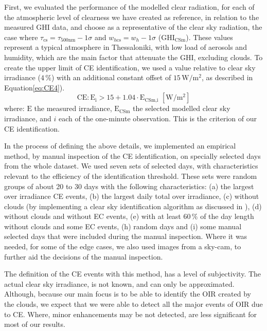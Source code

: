 \documentclass[preprint, 3p,
authoryear]{elsarticle} %
\begin{document}
First, we evaluated the performance of the modelled clear radiation, for
each of the atmospheric level of clearness we have created as reference,
in relation to the measured GHI data, and choose as a representative of
the clear sky radiation, the case where
\(\tau_{\text{cs}} = \tau_{500\text{nm}} - 1\sigma\) and
\(w_{h\text{cs}} = w_h - 1\sigma\) (\(\text{GHI}_\text{CSm}\)). These
values represent a typical atmosphere in Thessaloniki, with low load of
aerosols and humidity, which are the main factor that attenuate the GHI,
excluding clouds. To create the upper limit of CE identification, we
used a value relative to clear sky irradiance (\(4\,\%\)) with an
additional constant offset of \(15\,\text{W}/\text{m}^2\), as described
in Equation\nobreakspace\ref{eq:CE4}). \begin{equation}
\text{CE} : \text{E}_\text{i} > 15 + 1.04 \cdot \text{E}_\text{CSm,i} \,\,[\text{W}/\text{m}^2] \label{eq:CE4}
\end{equation} where: \(\text{E}\) the measured irradiance,
\(\text{E}_\text{CSm}\) the selected modelled clear sky irradiance, and
\(i\) each of the one-minute observation. This is the criterion of our
CE identification.

In the process of defining the above details, we implemented an
empirical method, by manual inspection of the CE identification, on
specially selected days from the whole dataset. We used seven sets of
selected days, with characteristics relevant to the efficiency of the
identification threshold. These sets were random groups of about 20 to
30 days with the following characteristics: (a) the largest over
irradiance CE events, (b) the largest daily total over irradiance, (c)
without clouds (by implementing a clear sky identification algorithm as
discussed in \citet{Natsis2023}), (d) without clouds and without EC
events, (e) with at least \(60\,\%\) of the day length without clouds
and some EC events, (h) random days and (i) some manual selected days
that were included during the manual inspection. Where it was needed,
for some of the edge cases, we also used images from a sky-cam, to
further aid the decisions of the manual inspection.

The definition of the CE events with this method, has a level of
subjectivity. The actual clear sky irradiance, is not known, and can
only be approximated. Although, because our main focus is to be able to
identify the OIR created by the clouds, we expect that we were able to
detect all the major events of OIR due to CE. Where, minor enhancements
may be not detected, are less significant for most of our results.
\end{document}
